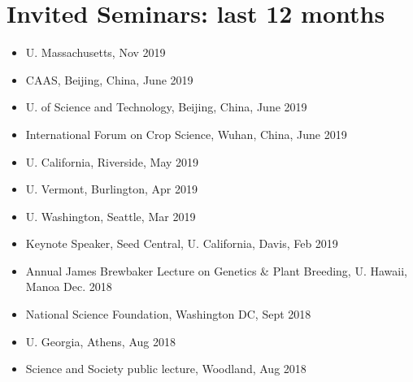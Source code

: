 \section*{Invited Seminars: last 12 months}
\begin{itemize}
\setlength\itemsep{0ex}
\item U. Massachusetts, Nov 2019
\item CAAS, Beijing, China, June 2019
\item U. of Science and Technology, Beijing, China, June 2019
\item International Forum on Crop Science, Wuhan, China, June 2019
\item U. California, Riverside, May 2019
\item U. Vermont, Burlington, Apr 2019
\item U. Washington, Seattle, Mar 2019
\item Keynote Speaker, Seed Central, U. California, Davis, Feb 2019
\item Annual James Brewbaker Lecture on Genetics \& Plant Breeding, U. Hawaii, Manoa Dec. 2018
\item National Science Foundation, Washington DC, Sept 2018
\item U. Georgia, Athens, Aug 2018
\item Science and Society public lecture, Woodland, Aug 2018

\end{itemize}
